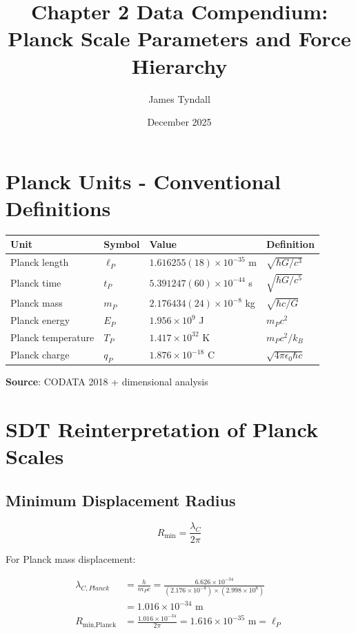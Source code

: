 \documentclass{article}
\title{Chapter 2 Data Compendium:\\Planck Scale Parameters and Force Hierarchy}
\author{James Tyndall}
\date{December 2025}
\begin{document}
\maketitle

\section{Planck Units - Conventional Definitions}

\begin{longtable}{llll}
\toprule
\textbf{Unit} & \textbf{Symbol} & \textbf{Value} & \textbf{Definition} \\
\midrule
Planck length & $\ell_P$ & $1.616255(18) \times 10^{-35}$ m & $\sqrt{\hbar G/c^3}$ \\
Planck time  & $t_P$ & $5.391247(60) \times 10^{-44}$ s & $\sqrt{\hbar G/c^5}$ \\
Planck mass & $m_P$ & $2.176434(24) \times 10^{-8}$ kg & $\sqrt{\hbar c/G}$ \\
Planck energy & $E_P$ & $1.956 \times 10^9$ J & $m_P c^2$ \\
Planck temperature & $T_P$ & $1.417 \times 10^{32}$ K & $m_P c^2/k_B$ \\
Planck charge & $q_P$ & $1.876 \times 10^{-18}$ C & $\sqrt{4\pi\epsilon_0 \hbar c}$ \\
\bottomrule
\end{longtable}

\textbf{Source}: CODATA 2018 + dimensional analysis

\section{SDT Reinterpretation of Planck Scales}

\subsection{Minimum Displacement Radius}

\begin{equation}
R_{\text{min}} = \frac{\lambda_C}{2\pi}
\end{equation}

For Planck mass displacement:

\begin{align}
\lambda_{C,Planck} &= \frac{h}{m_P c} = \frac{6.626 \times 10^{-34}}{(2.176 \times 10^{-8}) \times (2.998 \times 10^8)} \\
&= 1.016 \times 10^{-34} \text{ m} \\
R_{\text{min,Planck}} &= \frac{1.016 \times 10^{-34}}{2\pi} = 1.616 \times 10^{-35} \text{ m} = \ell_P
\end{align}
\end{document}
